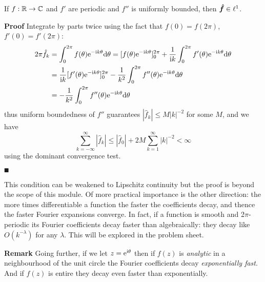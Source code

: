 \begin{lemma} If $f : {\mathbb R} \rightarrow {\mathbb C}$ and $f'$ are periodic  and $f''$ is uniformly bounded, then ${\mbox{\boldmath$\hat f$\unboldmath}} \in \ell^1$.

\end{lemma}
\textbf{Proof} Integrate by parts twice using the fact that $f(0) = f(2\ensuremath{\pi})$, $f'(0) = f'(2\ensuremath{\pi})$:
\begin{align*}
2\ensuremath{\pi}\hat f_k &= \ensuremath{\int}_0^{2\ensuremath{\pi}} f(\ensuremath{\theta}) {\rm e}^{-{\rm i} k \ensuremath{\theta}} {\rm d}\ensuremath{\theta} =
[f(\ensuremath{\theta}) {\rm e}^{-{\rm i} k \ensuremath{\theta}}]_0^{2\ensuremath{\pi}} + {1 \over {\rm i} k} \ensuremath{\int}_0^{2\ensuremath{\pi}} f'(\ensuremath{\theta}) {\rm e}^{-{\rm i} k \ensuremath{\theta}} {\rm d}\ensuremath{\theta} \\
&= {1 \over {\rm i} k} [f'(\ensuremath{\theta}) {\rm e}^{-{\rm i} k \ensuremath{\theta}}]_0^{2\ensuremath{\pi}} - {1 \over k^2} \ensuremath{\int}_0^{2\ensuremath{\pi}} f''(\ensuremath{\theta}) {\rm e}^{-{\rm i} k \ensuremath{\theta}} {\rm d}\ensuremath{\theta} \\
&= - {1 \over k^2} \ensuremath{\int}_0^{2\ensuremath{\pi}} f''(\ensuremath{\theta}) {\rm e}^{-{\rm i} k \ensuremath{\theta}} {\rm d}\ensuremath{\theta}
\end{align*}
thus uniform boundedness of $f''$ guarantees $|\hat f_k| \ensuremath{\leq} M |k|^{-2}$ for some $M$, and we have
\[
\ensuremath{\sum}_{k = -\ensuremath{\infty}}^\ensuremath{\infty} |\hat f_k| \ensuremath{\leq} |\hat f_0|  + 2M \ensuremath{\sum}_{k = 1}^\ensuremath{\infty} |k|^{-2}  < \ensuremath{\infty}
\]
using the dominant convergence test.

\ensuremath{\QED}

This condition can be weakened to Lipschitz continuity but the proof is  beyond the scope of this module. Of more practical importance is the other direction: the more times differentiable a function the faster the coefficients decay, and thence the faster Fourier expansions converge. In fact, if a function is smooth and 2\ensuremath{\pi}-periodic its Fourier coefficients decay faster than algebraically: they decay like $O(k^{-\ensuremath{\lambda}})$ for any $\ensuremath{\lambda}$. This will be explored in the problem sheet.

\textbf{Remark} Going further, if we let $z = {\rm e}^{{\rm i} \ensuremath{\theta}}$ then if $f(z)$ is \emph{analytic} in a neighbourhood of the unit circle the Fourier coefficients decay \emph{exponentially fast}. And if $f(z)$ is entire they decay even faster than exponentially.

